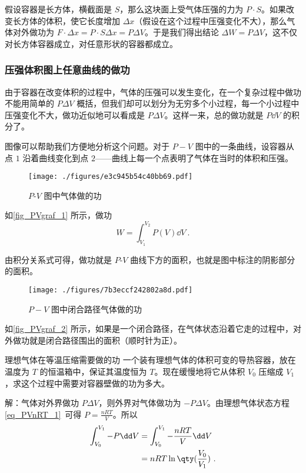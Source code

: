 假设容器是长方体，横截面是 $S$，那么这块面上受气体压强的力为 $P\cdot S$。如果改变长方体的体积，使它长度增加 $\Delta x$（假设在这个过程中压强变化不大），那么气体对外做功为 $F\cdot \Delta x=P\cdot S\Delta x=P\Delta V$。于是我们得出结论 $\Delta W=P\Delta V$，这不仅对长方体容器成立，对任意形状的容器都成立。
\subsubsection{压强体积图上任意曲线的做功}
由于容器在改变体积的过程中，气体的压强可以发生变化，在一个复杂过程中做功不能用简单的 $P\Delta V$ 概括，但我们却可以划分为无穷多个小过程，每一个小过程中压强变化不大，做功近似地可以看成是 $P\Delta V$。这样一来，总的做功就是 $P\dd V$ 的积分了。

图像可以帮助我们方便地分析这个问题。对于 $P-V$ 图中的一条曲线，设容器从点 $1$ 沿着曲线变化到点 $2$——曲线上每一个点表明了气体在当时的体积和压强。
\begin{figure}[ht]
\centering
\texttt{[image: ./figures/e3c945b54c40bb69.pdf]}
\caption{$P$-$V$ 图中气体做的功} \label{fig_PVgraf_1}
\end{figure}

如\autoref{fig_PVgraf_1} 所示，做功
\begin{equation}\label{eq_PVgraf_1}
W = \int_{V_1}^{V_2}P(V) \dd{V}~.
\end{equation}

由积分关系式可得，做功就是 $P$-$V$ 曲线下方的面积，也就是图中标注的阴影部分的面积。 

\begin{figure}[ht]  
\centering
\texttt{[image: ./figures/7b3eccf242802a8d.pdf]}
\caption{$P-V$ 图中闭合路径气体做的功} \label{fig_PVgraf_2}
\end{figure}

如\autoref{fig_PVgraf_2} 所示，如果是一个闭合路径，在气体状态沿着它走的过程中，对外做功就是闭合路径围出的面积（顺时针为正）。

\begin{example}{理想气体在等温压缩需要做的功}
一个装有理想气体的体积可变的导热容器，放在温度为 $T$ 的恒温箱中，保证其温度恒为 $T$。现在缓慢地将它从体积 $V_0$ 压缩成 $V_1$，求这个过程中需要对容器壁做的功为多大。

解：气体对外界做功 $P\Delta V$，则外界对气体做功为 $-P\Delta V$。由理想气体状态方程\autoref{eq_PVnRT_1}~可得 $P=\frac{nRT}{V}$。所以
\begin{equation}
\begin{aligned}
\int_{V_0}^{V_1} -P\dd V&=\int_{V_0}^{V_1} -\frac{nRT}{V} \dd V \\
&=nRT \ln\qty(\frac{V_0}{V_1})~.
\end{aligned}
\end{equation}
\end{example}
